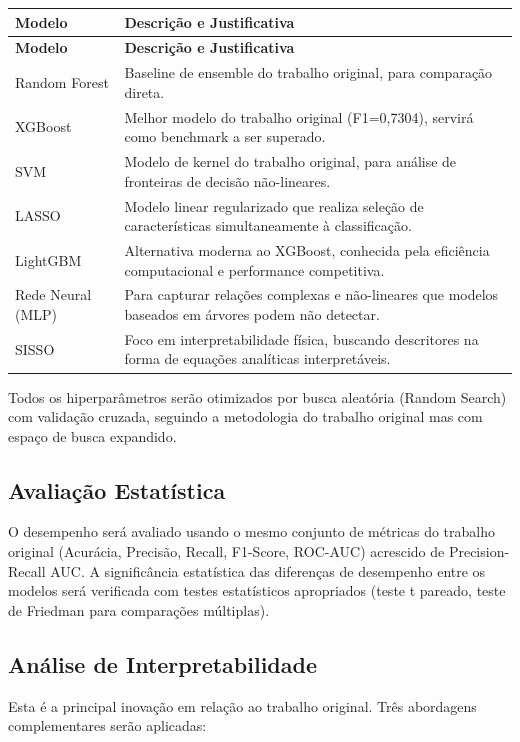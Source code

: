 \documentclass[12pt, a4paper]{article}
\begin{document}
\begin{longtable}{|p{3cm}|p{9cm}|}
\hline
\textbf{Modelo} & \textbf{Descrição e Justificativa} \\
\hline
\endfirsthead
\hline
\textbf{Modelo} & \textbf{Descrição e Justificativa} \\
\hline
\endhead
\hline
\endfoot
\endlastfoot
Random Forest & Baseline de ensemble do trabalho original, para comparação direta. \\
\hline
XGBoost & Melhor modelo do trabalho original (F1=0,7304), servirá como benchmark a ser superado. \\
\hline
SVM & Modelo de kernel do trabalho original, para análise de fronteiras de decisão não-lineares. \\
\hline
LASSO & Modelo linear regularizado que realiza seleção de características simultaneamente à classificação. \\
\hline
LightGBM & Alternativa moderna ao XGBoost, conhecida pela eficiência computacional e performance competitiva. \\
\hline
Rede Neural (MLP) & Para capturar relações complexas e não-lineares que modelos baseados em árvores podem não detectar. \\
\hline
SISSO & Foco em interpretabilidade física, buscando descritores na forma de equações analíticas interpretáveis. \\
\hline
\end{longtable}

Todos os hiperparâmetros serão otimizados por busca aleatória (Random Search) com validação cruzada, seguindo a metodologia do trabalho original mas com espaço de busca expandido.

\subsection{Avaliação Estatística}
O desempenho será avaliado usando o mesmo conjunto de métricas do trabalho original (Acurácia, Precisão, Recall, F1-Score, ROC-AUC) acrescido de Precision-Recall AUC. A significância estatística das diferenças de desempenho entre os modelos será verificada com testes estatísticos apropriados (teste t pareado, teste de Friedman para comparações múltiplas).

\subsection{Análise de Interpretabilidade}
Esta é a principal inovação em relação ao trabalho original. Três abordagens complementares serão aplicadas:
\end{document}
